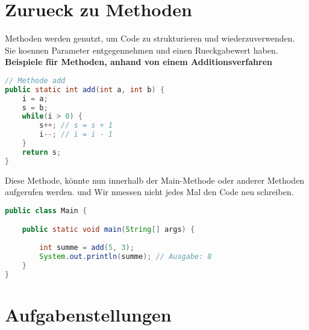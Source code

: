 \documentclass[12pt, a4paper]{article}
\begin{document}
\section{Zurueck zu Methoden}
Methoden werden genutzt, um Code zu strukturieren und wiederzuverwenden. \\
Sie koennen Parameter entgegennehmen und einen Rueckgabewert haben. \vspace{0.5cm} \\
\textbf{Beispiele für Methoden, anhand von einem Additionsverfahren}
\begin{lstlisting}[language=java,title=Beispiel: Addition]
// Methode add
public static int add(int a, int b) {
    i = a;
    s = b;
    while(i > 0) {
        s++; // s = s + 1
        i--; // i = i - 1
    }
    return s;
}
\end{lstlisting}
Diese Methode, könnte nun innerhalb der Main-Methode oder anderer Methoden aufgerufen werden. und Wir muessen nicht jedes Mal den Code neu schreiben.
\begin{lstlisting}[language=java,title=Beispiel: Aufruf der Methode]
public class Main {

    public static void main(String[] args) {
    
        int summe = add(5, 3);
        System.out.println(summe); // Ausgabe: 8
    }
}
\end{lstlisting}
\newpage
\section*{Aufgabenstellungen}
\end{document}
